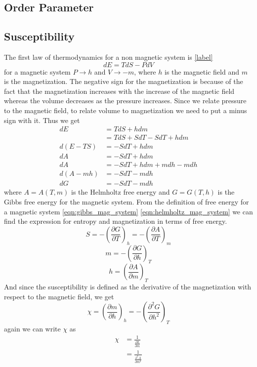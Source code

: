 	\subsection{Order Parameter}
	\subsection{Susceptibility}
	The first law of thermodynamics for a non magnetic system is \ref{label}
	\begin{equation}
		dE = TdS - PdV
	\end{equation}
	for a magnetic system $P \rightarrow h$ and $V \rightarrow -m$, where $h$ is the magnetic field and $m$ is the magnetization. The negative sign for the magnetization is because of the fact that the magnetization increases with the increase of the magnetic field whereas the volume decreases as the pressure increases. Since we relate pressure to the magnetic field, to relate volume to magnetization we need to put a minus sign with it. Thus we get
	\begin{align}
		dE &= TdS + hdm \\
		   &= TdS + SdT - SdT + h dm \\
		d(E - TS)  &= -SdT + h dm \\
		dA &= -SdT + h dm \label{eqn:helmholtz_mag_system} \\
		dA &= -SdT + h dm + m dh -m dh \\
		d(A - mh) &= -SdT - m dh\\
		dG &= -SdT -m dh \label{eqn:gibbs_mag_system}
	\end{align} 
	where $A=A(T,m)$ is the  Helmholtz free energy and $G=G(T,h)$ is the Gibbs free energy for the magnetic system. From the definition of free energy for a magnetic system \ref{eqn:gibbs_mag_system} \ref{eqn:helmholtz_mag_system} we can find the expression for entropy and magnetization in terms of free energy.
	\begin{equation}
		S = -\left(\frac{\partial G}{\partial T}\right)_h = -\left(\frac{\partial A}{\partial T}\right)_m
	\end{equation}
	\begin{equation}
		m = -\left(\frac{\partial G}{\partial h}\right)_T
		\label{eqn:magnetization_def}
	\end{equation}
	\begin{equation}
		h = \left(\frac{\partial A}{\partial m}\right)_T
		\label{eqn:mag_field_def}
	\end{equation}	
	And since the susceptibility is defined as the derivative of the magnetization with respect to the magnetic field, we get
	\begin{equation}
		\chi = \left(\frac{\partial m}{\partial h}\right)_h = - \left(\frac{\partial^2G}{\partial h ^2}\right)_T
		\label{eqn:susceptibility_def}
	\end{equation}
	again we can write $\chi$ as
	\begin{align}
		\chi &= \frac{1}{\frac{\partial h}{\partial m}} \nonumber \\
			 &= \frac{1}{\frac{\partial^2 A}{\partial m ^2}} \label{eqn:susceptibility_def2}
	\end{align}
	
